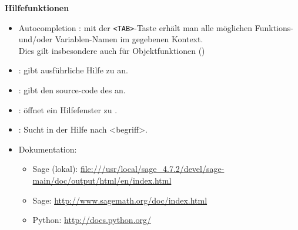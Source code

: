 \documentclass[a4paper,9pt,DIV15,twocolumn]{scrartcl}
\begin{document}
\textbf{Hilfefunktionen}
\begin{itemize}
\item {\color{blue} Autocompletion :} mit der {\color{blue} \verb~<TAB>~}-Taste erhält man alle möglichen Funktions- und/oder Variablen-Namen im gegebenen Kontext.\\
Dies gilt insbesondere auch für Objektfunktionen ()
\item {\color{blue}  :} gibt ausführliche Hilfe zu  an.
\item {\color{blue}  :} gibt den source-code des  an.
\item {\color{blue}  :} öffnet ein Hilfefenster zu .
\item {\color{blue}  :} Sucht in der Hilfe nach <begriff>.
\item Dokumentation:
\begin{itemize}
\item Sage (lokal): \url{file:///usr/local/sage_4.7.2/devel/sage-main/doc/output/html/en/index.html}
\item Sage: \url{http://www.sagemath.org/doc/index.html}
\item Python: \url{http://docs.python.org/}
\end{itemize}
\end{itemize}
\end{document}

